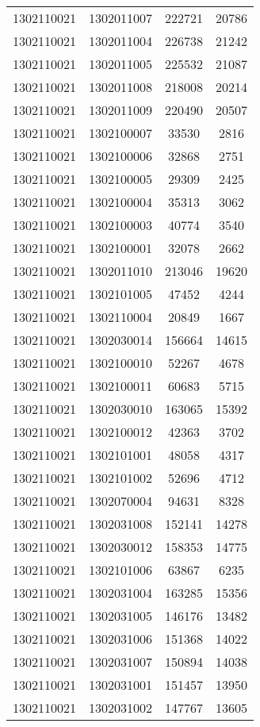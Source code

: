 \begin{longtable}[h]{llcc}
		1302110021 & 1302011007 & 222721 & 20786\\
		1302110021 & 1302011004 & 226738 & 21242\\
		1302110021 & 1302011005 & 225532 & 21087\\
		1302110021 & 1302011008 & 218008 & 20214\\
		1302110021 & 1302011009 & 220490 & 20507\\
		1302110021 & 1302100007 & 33530 & 2816\\
		1302110021 & 1302100006 & 32868 & 2751\\
		1302110021 & 1302100005 & 29309 & 2425\\
		1302110021 & 1302100004 & 35313 & 3062\\
		1302110021 & 1302100003 & 40774 & 3540\\
		1302110021 & 1302100001 & 32078 & 2662\\
		1302110021 & 1302011010 & 213046 & 19620\\
		1302110021 & 1302101005 & 47452 & 4244\\
		1302110021 & 1302110004 & 20849 & 1667\\
		1302110021 & 1302030014 & 156664 & 14615\\
		1302110021 & 1302100010 & 52267 & 4678\\
		1302110021 & 1302100011 & 60683 & 5715\\
		1302110021 & 1302030010 & 163065 & 15392\\
		1302110021 & 1302100012 & 42363 & 3702\\
		1302110021 & 1302101001 & 48058 & 4317\\
		1302110021 & 1302101002 & 52696 & 4712\\
		1302110021 & 1302070004 & 94631 & 8328\\
		1302110021 & 1302031008 & 152141 & 14278\\
		1302110021 & 1302030012 & 158353 & 14775\\
		1302110021 & 1302101006 & 63867 & 6235\\
		1302110021 & 1302031004 & 163285 & 15356\\
		1302110021 & 1302031005 & 146176 & 13482\\
		1302110021 & 1302031006 & 151368 & 14022\\
		1302110021 & 1302031007 & 150894 & 14038\\
		1302110021 & 1302031001 & 151457 & 13950\\
		1302110021 & 1302031002 & 147767 & 13605\\

\end{longtable}
